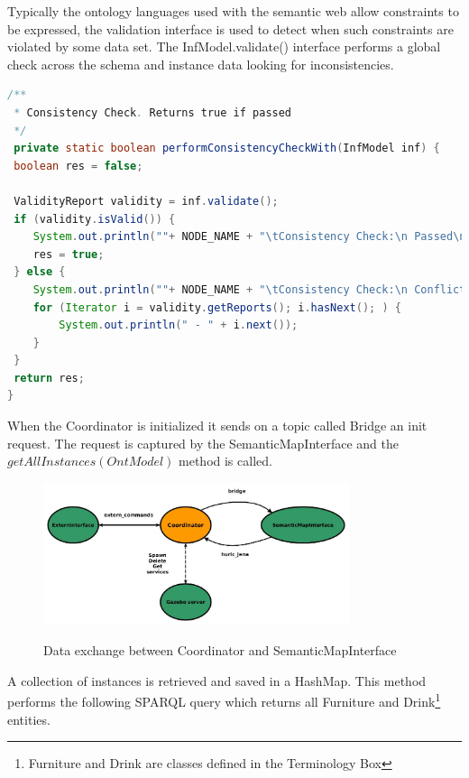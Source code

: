 Typically the ontology languages used with the semantic web allow constraints to be expressed, the validation interface is used to detect when such constraints are violated by some data set. The InfModel.validate() interface performs a global check across the schema and instance data looking for inconsistencies. 


\begin{lstlisting}[language=Java]
/** 
 * Consistency Check. Returns true if passed
 */
 private static boolean performConsistencyCheckWith(InfModel inf) {
 boolean res = false; 

 ValidityReport validity = inf.validate();
 if (validity.isValid()) {
	System.out.println(""+ NODE_NAME + "\tConsistency Check:\n Passed\n");
	res = true;
 } else {
	System.out.println(""+ NODE_NAME + "\tConsistency Check:\n Conflicts\n");
	for (Iterator i = validity.getReports(); i.hasNext(); ) {
	    System.out.println(" - " + i.next());
	}
 }
 return res;
}
\end{lstlisting}

When the Coordinator is initialized it sends on a topic called Bridge an init request. The request is captured by the SemanticMapInterface and the $getAllInstances(OntModel)$ method is called. 

\begin{figure}[H]
\centering
\includegraphics[width=0.8\textwidth]{imgs/topics1.jpg}
\label{fig:actions}
\caption{Data exchange between Coordinator and SemanticMapInterface}
\end{figure}


A collection of instances is retrieved and saved in a HashMap. This method performs the following SPARQL query which returns all Furniture and Drink\footnote{Furniture and Drink are classes defined in the Terminology Box} entities. 

